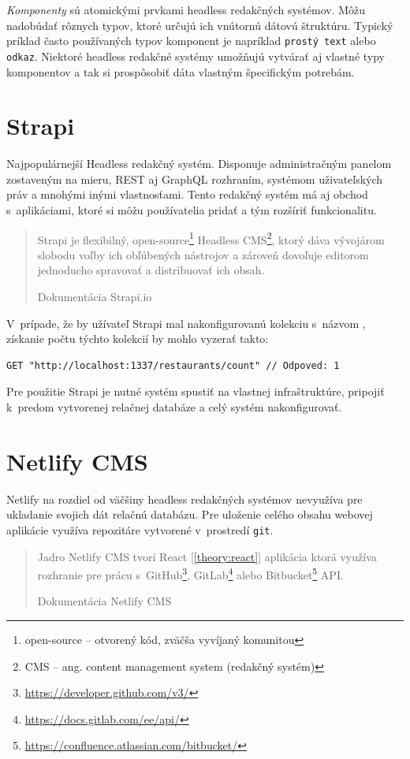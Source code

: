 \noindent \emph{Komponenty} sú atomickými prvkami headless redakčných systémov. Môžu nadobúdať rôznych typov, ktoré určujú ich vnútornú dátovú štruktúru. Typický príklad často používaných typov komponent je napríklad \texttt{prostý text} alebo \texttt{odkaz}. Niektoré headless redakčné systémy umožňujú vytvárať aj vlastné typy komponentov a tak si prospôsobiť dáta vlastným špecifickým potrebám.

\section{Strapi}
Najpopulárnejší Headless redakčný systém. Disponuje administračným panelom zostaveným na mieru, REST aj GraphQL rozhraním, systémom uživateľských práv a mnohými inými vlastnosťami. Tento redakčný systém má aj obchod s~aplikáciami, ktoré si môžu používatelia pridať a tým rozšíriť funkcionalitu. 

\blockquote[Dokumentácia Strapi.io \cite{StrapiDocs}]{Strapi je flexibilný, open-source\footnote{open-source -- otvorený kód, zväčša vyvíjaný komunitou} Headless CMS\footnote{CMS -- ang. content management system (redakčný systém)}, ktorý dáva vývojárom slobodu voľby ich obľúbených nástrojov a zároveň dovoľuje editorom jednoducho spravovať a distribuovať ich obsah.}

\noindent V~prípade, že by užívateľ Strapi mal nakonfigurovanú kolekciu s~názvom , získanie počtu týchto kolekcií by mohlo vyzerať takto: \\

\begin{lstlisting}[caption=Príklad HTTP požiadavku na REST rozhranie Strapi.]
	GET "http://localhost:1337/restaurants/count" // Odpoved: 1
\end{lstlisting}

\medskip

\noindent Pre použitie Strapi je nutné systém spustiť na vlastnej infraštruktúre, pripojiť k~predom vytvorenej relačnej databáze a celý systém nakonfigurovať.

\section{Netlify CMS}
Netlify na rozdiel od väčšiny headless redakčných systémov nevyužíva pre ukladanie svojich dát relačnú databázu. Pre uloženie celého obsahu webovej aplikácie využíva repozitáre vytvorené v~prostredí \texttt{git}.

\blockquote[Dokumentácia Netlify CMS \cite{NetlifyDocs}]{Jadro Netlify CMS tvorí React [\ref{theory:react}] aplikácia ktorá využíva rozhranie pre prácu s~GitHub\footnote{\href{https://developer.github.com/v3/}{https://developer.github.com/v3/}}, GitLab\footnote{\href{https://docs.gitlab.com/ee/api/}{https://docs.gitlab.com/ee/api/}} alebo Bitbucket\footnote{\href{https://confluence.atlassian.com/bitbucket/}{https://confluence.atlassian.com/bitbucket/}} API.}


